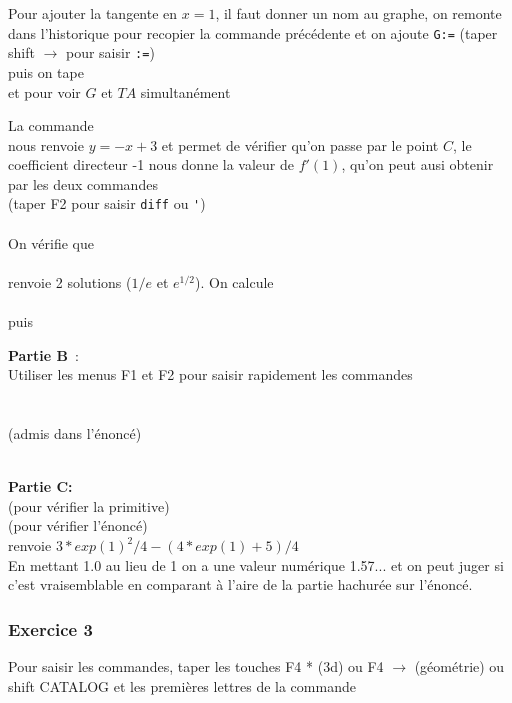 \documentclass{article}
\begin{document}
\begin{giacjshere}
Pour ajouter la tangente en $x=1$, il faut donner un nom au graphe, 
on remonte dans l'historique pour recopier la commande précédente et on ajoute
\verb|G:=| (taper shift $\rightarrow$ pour saisir \verb|:=|)\\
puis on tape \\
et pour voir $G$ et $TA$ simultanément\\

La commande\\
nous renvoie $y=-x+3$ et permet de vérifier qu'on passe par le point $C$, 
le coefficient directeur -1 nous donne la valeur de $f'(1)$, qu'on
peut ausi obtenir par les deux commandes\\
(taper F2 pour saisir \verb|diff| ou \verb|'|)\\
\\
On vérifie que \\
 \\
renvoie 2 solutions ($1/e$ et $e^{1/2}$).
On calcule\\
\\
puis\\

{\bf Partie B}~:\\
Utiliser les menus F1 et F2 pour saisir rapidement les commandes\\
\\
\\
 (admis dans l'énoncé)\\
\\

{\bf Partie C:}\\
 (pour vérifier la primitive)\\
 (pour vérifier l'énoncé)\\
renvoie $3*exp(1)^2/4-(4*exp(1)+5)/4$\\
En mettant 1.0 au lieu de 1 on a une valeur numérique 1.57... 
et on peut juger si c'est vraisemblable en comparant à l'aire 
de la partie hachurée sur l'énoncé.

\subsubsection{Exercice 3}
Pour saisir les commandes, taper les touches F4 * (3d) ou F4 $\rightarrow$
(géométrie) ou shift CATALOG et les premières lettres de la commande\\


\end{giacjshere}
\end{document}
